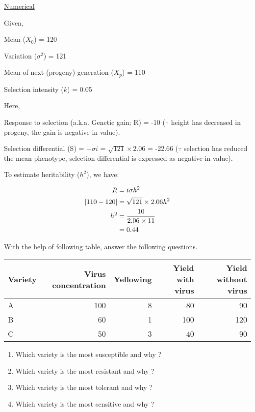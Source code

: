 \documentclass[
  answers,addpoints,12pt]{exam}
\providecommand{\tightlist}{%
  \setlength{\itemsep}{0pt}\setlength{\parskip}{0pt}}
\newcommand{\bsolution}{\begin{solution}}
\newcommand{\esolution}{\end{solution}}
\begin{document}
\bsolution

\underline{Numerical}

Given,

Mean (\(X_0\)) = 120

Variation (\(\sigma^2\)) = 121

Mean of next (progeny) generation (\(X_p\)) = 110

Selection intensity (\(k\)) = 0.05

Here,

Response to selection (a.k.a. Genetic gain; R) = -10 (\(\because\) height has decreased in progeny, the gain is negative in value).

Selection differential (S) = \(-\sigma i\) = \(\sqrt{121} \times 2.06\) = -22.66 (\(\because\) selection has reduced the mean phenotype, selection differential is expressed as negative in value).

To estimate heritability (\(h^2\)), we have:

\begin{align}
R &= i \sigma h^{2} \notag \\
|110-120|  &= \sqrt{121} \times 2.06 h^{2} \notag \\
h^2 &= \frac{10}{2.06 \times 11} \notag \\
  &= 0.44 \notag
\end{align}

\esolution

\question[4] \label{quest:fourth}

With the help of following table, answer the following questions.

\begin{table}
\centering
\begin{tabular}{lrrrr}
\toprule
Variety & Virus concentration & Yellowing & Yield with virus & Yield without virus\\
\midrule
A & 100 & 8 & 80 & 90\\
B & 60 & 1 & 100 & 120\\
C & 50 & 3 & 40 & 90\\
\bottomrule
\end{tabular}
\end{table}

\begin{enumerate}
\def\labelenumi{\arabic{enumi}.}
\tightlist
\item
  Which variety is the most susceptible and why ?
\item
  Which variety is the most resistant and why ?
\item
  Which variety is the most tolerant and why ?
\item
  Which variety is the most sensitive and why ?
\end{enumerate}
\end{document}

